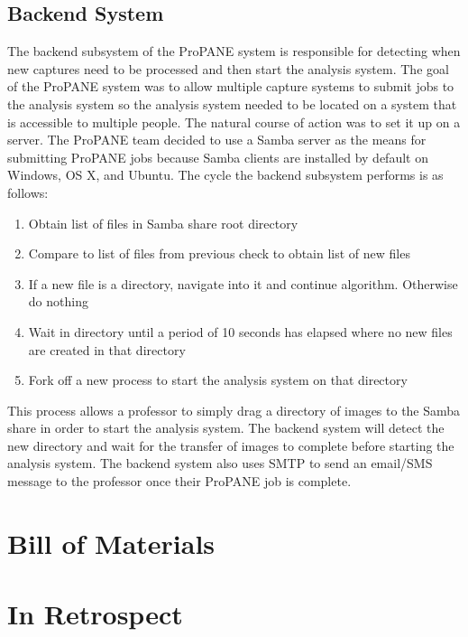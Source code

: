\documentclass[]{article}
\begin{document}
		\subsection{Backend System}
			The backend subsystem of the ProPANE system is responsible for detecting when new captures need to be processed and then start the analysis system. The goal of the ProPANE system was to allow multiple capture systems to submit jobs to the analysis system so the analysis system needed to be located on a system that is accessible to multiple people. The natural course of action was to set it up on a server. The ProPANE team decided to use a Samba server as the means for submitting ProPANE jobs because Samba clients are installed by default on Windows, OS X, and Ubuntu. The cycle the backend subsystem performs is as follows:
			\begin{enumerate}
				\item Obtain list of files in Samba share root directory
				\item Compare to list of files from previous check to obtain list of new files
				\item If a new file is a directory, navigate into it and continue algorithm. Otherwise do nothing
				\item Wait in directory until a period of 10 seconds has elapsed where no new files are created in that directory
				\item Fork off a new process to start the analysis system on that directory
			\end{enumerate}
			This process allows a professor to simply drag a directory of images to the Samba share in order to start the analysis system. The backend system will detect the new directory and wait for the transfer of images to complete before starting the analysis system. The backend system also uses SMTP to send an email/SMS message to the professor once their ProPANE job is complete. 

	\section{Bill of Materials}
	
	\section{In Retrospect}
	
	\newpage
	
	
\end{document}

